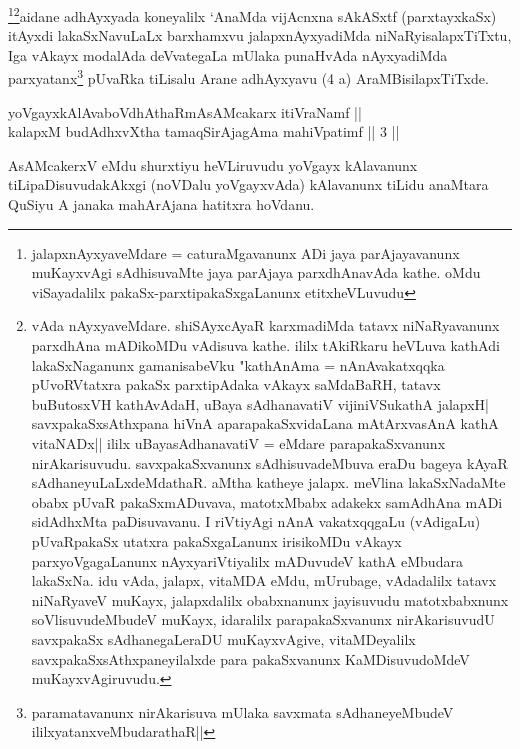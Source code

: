 \begin{artha}
\footnote{jalapxnAyxyaveMdare = caturaMgavanunx ADi jaya parAjayavanunx muKayxvAgi sAdhisuvaMte jaya parAjaya parxdhAnavAda kathe. oMdu viSayadalilx pakaSx-parxtipakaSxgaLanunx etitxheVLuvudu}\footnote{vAda nAyxyaveMdare. shiSAyxcAyaR karxmadiMda tatavx niNaRyavanunx parxdhAna mADikoMDu vAdisuva kathe. ililx tAkiRkaru heVLuva kathAdi lakaSxNaganunx gamanisabeVku "kathAnAma = nAnAvakatxqqka pUvoRVtatxra pakaSx parxtipAdaka vAkayx saMdaBaRH, tatavx buButosxVH kathAvAdaH, uBaya sAdhanavatiV vijiniVSukathA jalapxH| savxpakaSxsAthxpana hiVnA aparapakaSxvidaLana mAtArxvasAnA kathA vitaNADx|| ililx uBayasAdhanavatiV = eMdare parapakaSxvanunx nirAkarisuvudu. savxpakaSxvanunx sAdhisuvadeMbuva eraDu bageya kAyaR sAdhaneyuLaLxdeMdathaR. aMtha katheye jalapx. meVlina lakaSxNadaMte obabx pUvaR pakaSxmADuvava, matotxMbabx adakekx samAdhAna mADi sidAdhxMta paDisuvavanu. I riVtiyAgi nAnA vakatxqqgaLu (vAdigaLu) pUvaRpakaSx utatxra pakaSxgaLanunx irisikoMDu vAkayx parxyoVgagaLanunx nAyxyariVtiyalilx mADuvudeV kathA eMbudara lakaSxNa. idu vAda, jalapx, vitaMDA eMdu, mUrubage, vAdadalilx tatavx niNaRyaveV muKayx, jalapxdalilx obabxnanunx jayisuvudu matotxbabxnunx soVlisuvudeMbudeV muKayx, idaralilx parapakaSxvanunx nirAkarisuvudU savxpakaSx sAdhanegaLeraDU muKayxvAgive, vitaMDeyalilx savxpakaSxsAthxpaneyilalxde para pakaSxvanunx KaMDisuvudoMdeV muKayxvAgiruvudu.}aidane adhAyxyada koneyalilx `AnaMda vijAcnxna sAkASxtf (parxtayxkaSx) itAyxdi lakaSxNavuLaLx barxhamxvu jalapxnAyxyadiMda niNaRyisalapxTiTxtu, Iga vAkayx modalAda deVvategaLa mUlaka punaHvAda nAyxyadiMda parxyatanx\footnote{paramatavanunx nirAkarisuva mUlaka savxmata sAdhaneyeMbudeV ililxyatanxveMbudarathaR||} pUvaRka tiLisalu Arane adhAyxyavu (4 a) AraMBisilapxTiTxde.
\end{artha}

\begin{shl}
yoVgayxkAlAvaboVdhAthaRmAsAMcakarx itiVraNamf || \\
kalapxM budAdhxvX\s tha tamaqSirAjagAma mahiVpatimf \hfill ||  3 ||  
\end{shl}

\begin{artha}
AsAMcakerxV eMdu shurxtiyu heVLiruvudu yoVgayx kAlavanunx tiLipaDisuvudakAkxgi (noVDalu yoVgayxvAda) kAlavanunx tiLidu anaMtara QuSiyu A janaka mahArAjana hatitxra hoVdanu.
\end{artha}


